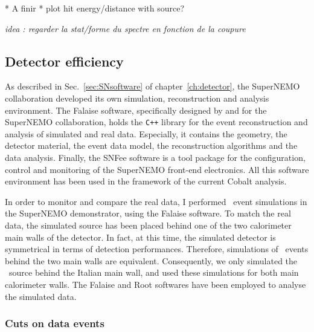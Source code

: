 * A finir *
plot hit energy/distance with source?

\emph{idea : regarder la stat/forme du spectre en fonction de la coupure}

\subsection{Detector efficiency}
\label{subsec:detector_efficiency}

As described in Sec.~\ref{sec:SNsoftware} of chapter~\ref{ch:detector}, the SuperNEMO collaboration developed its own simulation, reconstruction and analysis environment.
The Falaise software, specifically designed by and for the SuperNEMO collaboration, holds the \verb!C++! library for the event reconstruction and analysis of simulated and real data.
Especially, it contains the geometry, the detector material, the event data model, the reconstruction algorithms and the data analysis.
Finally, the SNFee software is a tool package for the configuration, control and monitoring of the SuperNEMO front-end electronics.
All this software environment has been used in the framework of the current Cobalt analysis.

In order to monitor and compare the real data, I performed \Co\ event simulations in the SuperNEMO demonstrator, using the Falaise software.
To match the real data, the simulated source has been placed behind one of the two calorimeter main walls of the detector.
In fact, at this time, the simulated detector is symmetrical in terms of detection performances.
Therefore, simulations of \Co\ events behind the two main walls are equivalent.
Consequently, we only simulated the \Co\ source behind the Italian main wall, and used these simulations for both main calorimeter walls.
The Falaise and Root softwares have been employed to analyse the simulated data.



\subsubsection{Cuts on data events}

